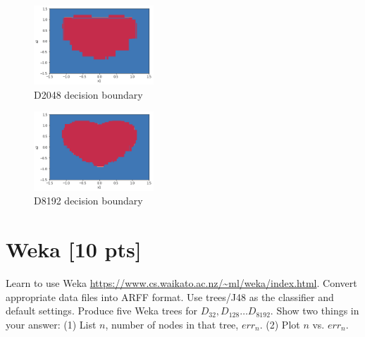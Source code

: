 \documentclass[a4paper]{article}
\theoremstyle{definition}
\newenvironment{soln}{
    \leavevmode\color{blue}\ignorespaces
}{}
\begin{document}
\begin{enumerate}
\begin{soln}
	\begin{figure}[h!]
	        \centering
	        \includegraphics[width=0.4\textwidth]{74.png} 
	        \captionsetup{labelformat=empty}
	        \caption{D2048 decision boundary}
	        \label{fig:D2048 boundary}
	  \end{figure}
	
	\begin{figure}[h!]
	        \centering
	        \includegraphics[width=0.4\textwidth]{75.png} 
	        \captionsetup{labelformat=empty}
	        \caption{D8192 decision boundary}
	        \label{fig:D8192 boundary}
	  \end{figure}


\end{soln}


\end{enumerate}

\section{Weka [10 pts]}
Learn to use Weka \url{https://www.cs.waikato.ac.nz/~ml/weka/index.html}.
Convert appropriate data files into ARFF format.
Use trees/J48 as the classifier and default settings.
Produce five Weka trees for $D_{32}, D_{128} \ldots D_{8192}$.  
Show two things in your answer: (1) List $n$, number of nodes in that tree, $err_n$. (2) Plot $n$ vs. $err_n$.
\end{document}
